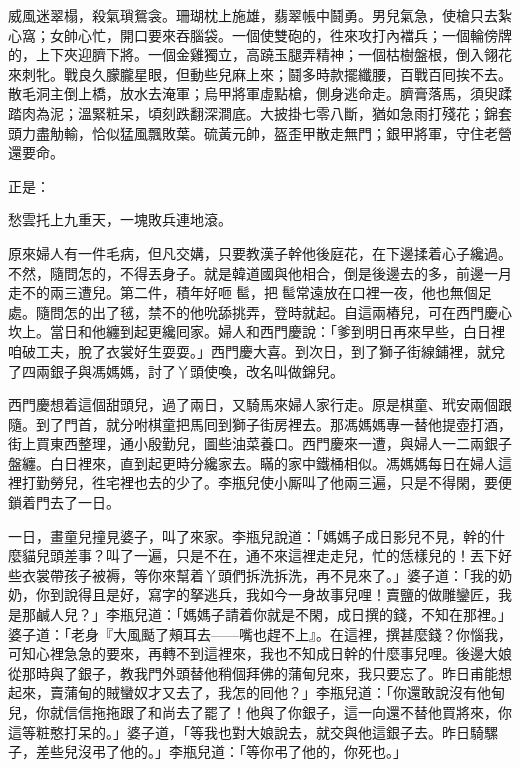 \begin{myquote}
威風迷翠榻，殺氣瑣鴛衾。珊瑚枕上施雄，翡翠帳中鬪勇。男兒氣急，使槍只去紮心窩；女帥心忙，開口要來吞腦袋。一個使雙砲的，徃來攻打內襠兵；一個輪傍牌的，上下夾迎臍下將。一個金雞獨立，高蹺玉腿弄精神；一個枯樹盤根，倒入翎花來刺牝。戰良久朦朧星眼，但動些兒麻上來；鬪多時款擺纖腰，百戰百囘挨不去。散毛洞主倒上橋，放水去淹軍；烏甲將軍虛點槍，側身逃命走。臍膏落馬，須臾蹂踏肉為泥；溫緊粧呆，頃刻跌翻深澗底。大披掛七零八斷，猶如急雨打殘花；錦套頭力盡觔輸，恰似猛風飄敗葉。硫黃元帥，盔歪甲散走無門；銀甲將軍，守住老營還要命。

正是：

愁雲托上九重天，一塊敗兵連地滾。
\end{myquote}

原來婦人有一件毛病，{}但凡交媾，只要教漢子幹他後庭花，在下邊揉着心子纔過。不然，隨問怎的，不得丟身子。就是韓道國與他相合，倒是後邊去的多，前邊一月走不的兩三遭兒。第二件，積年好咂𩫻䯲，把𩫻䯲常遠放在口裡一夜，他也無個足處。隨問怎的出了毧，禁不的他吮舔挑弄，登時就起。自這兩樁兒，可在西門慶心坎上。當日和他纏到起更纔囘家。婦人和西門慶說：「爹到明日再來早些，白日裡咱破工夫，脫了衣裳好生耍耍。」西門慶大喜。到次日，到了獅子街線鋪裡，就兌了四兩銀子與馮媽媽，討了丫頭使喚，改名叫做錦兒。

西門慶想着這個甜頭兒，過了兩日，又騎馬來婦人家行走。原是棋童、玳安兩個跟隨。到了門首，就分咐棋童把馬囘到獅子街房裡去。那馮媽媽專一替他提壺打酒，街上買東西整理，通小殷勤兒，圖些油菜養口。西門慶來一遭，與婦人一二兩銀子盤纏。白日裡來，直到起更時分纔家去。瞞的家中鐵桶相似。馮媽媽每日在婦人這裡打勤勞兒，徃宅裡也去的少了。李瓶兒使小厮叫了他兩三遍，只是不得閑，要便鎖着門去了一日。

一日，畫童兒撞見婆子，叫了來家。李瓶兒說道：「媽媽子成日影兒不見，幹的什麼貓兒頭差事？叫了一遍，只是不在，通不來這裡走走兒，忙的恁樣兒的！丟下好些衣裳帶孩子被褥，等你來幫着丫頭們拆洗拆洗，再不見來了。」婆子道：「我的奶奶，你到說得且是好，寫字的拏逃兵，我如今一身故事兒哩！賣鹽的做雕鑾匠，我是那鹹人兒？」{}李瓶兒道：「媽媽子請着你就是不閑，成日撰的錢，不知在那裡。」婆子道：「老身『大風颳了頰耳去——嘴也趕不上』。在這裡，撰甚麼錢？你惱我，可知心裡急急的要來，再轉不到這裡來，我也不知成日幹的什麼事兒哩。後邊大娘從那時與了銀子，教我門外頭替他稍個拜佛的蒲甸兒來，我只要忘了。昨日甫能想起來，賣蒲甸的賊蠻奴才又去了，我怎的囘他？」李瓶兒道：「你還敢說沒有他甸兒，你就信信拖拖跟了和尚去了罷了！他與了你銀子，這一向還不替他買將來，你這等粧憨打呆的。」婆子道，「等我也對大娘說去，就交與他這銀子去。昨日騎騾子，差些兒沒弔了他的。」李瓶兒道：「等你弔了他的，你死也。」

